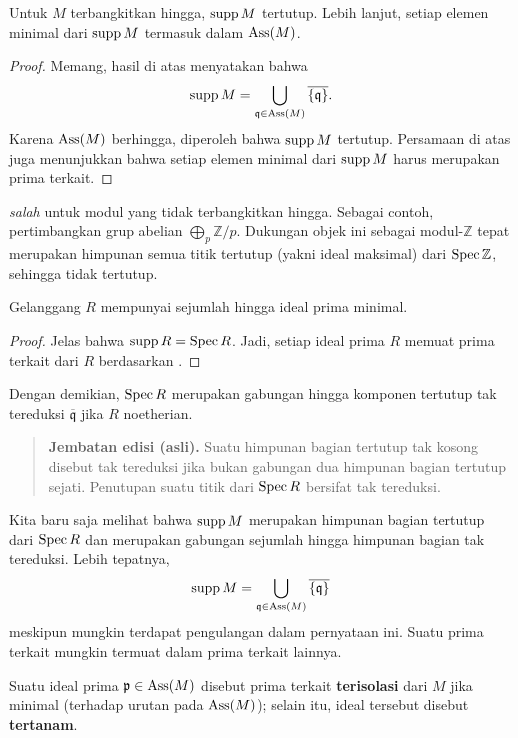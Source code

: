 \begin{corollary} \label{suppisclosed} Untuk $M$ terbangkitkan hingga,  
$\operatorname{supp} M$ tertutup. Lebih lanjut, setiap elemen minimal dari $\operatorname{supp} M$ termasuk dalam
$\operatorname{Ass}(M)$.
\end{corollary} 
\begin{proof} 
Memang, hasil di atas menyatakan bahwa
\[ \operatorname{supp} M  = \bigcup_{\mathfrak{q} \in \operatorname{Ass}(M)}
\overline{\left\{\mathfrak{q}\right\}}. \]
Karena $\operatorname{Ass}(M)$ berhingga, diperoleh bahwa $\operatorname{supp} M$ tertutup.
Persamaan di atas juga menunjukkan bahwa setiap elemen minimal dari $\operatorname{supp} M$ harus merupakan
prima terkait.
\end{proof} 

\begin{example} 
 \emph{salah} untuk modul yang tidak terbangkitkan
hingga. Sebagai contoh, pertimbangkan grup abelian $\bigoplus_p \mathbb{Z}/p$.
Dukungan objek ini sebagai modul-$\mathbb{Z}$ tepat merupakan himpunan semua
titik tertutup (yakni ideal maksimal) dari $\operatorname{Spec} \mathbb{Z}$, sehingga
tidak tertutup. 
\end{example} 

\begin{corollary} 
Gelanggang $R$ mempunyai sejumlah hingga ideal prima minimal. 
\end{corollary} 
\begin{proof} 
Jelas bahwa $\operatorname{supp} R = \operatorname{Spec} R$. Jadi, setiap ideal prima $R$
memuat prima terkait dari $R$ berdasarkan .
\end{proof} 

Dengan demikian, $\operatorname{Spec} R$ merupakan gabungan hingga komponen tertutup tak tereduksi
$\overline{\mathfrak{q}}$ jika $R$ noetherian.
\begin{quote}\small\textbf{Jembatan edisi (asli).}
Suatu himpunan bagian tertutup tak kosong disebut tak tereduksi jika bukan gabungan dua himpunan bagian
tertutup sejati. Penutupan suatu titik dari $\operatorname{Spec} R$ bersifat tak tereduksi.\end{quote}

Kita baru saja melihat bahwa $\operatorname{supp} M$ merupakan himpunan bagian tertutup dari $\operatorname{Spec} R$ dan merupakan gabungan
sejumlah hingga himpunan bagian tak tereduksi. Lebih tepatnya, 
\[ \operatorname{supp} M = \bigcup_{\mathfrak{q} \in \operatorname{Ass}(M)}
\overline{\left\{\mathfrak{q}\right\}}  \]
meskipun mungkin terdapat pengulangan dalam pernyataan ini. Suatu prima terkait mungkin termuat
dalam prima terkait lainnya.  

\begin{definition} 
Suatu ideal prima $\mathfrak{p} \in \operatorname{Ass}(M)$ disebut prima terkait \textbf{terisolasi} dari
$M$ jika minimal (terhadap urutan pada $\operatorname{Ass}(M)$); selain itu, ideal tersebut disebut
\textbf{tertanam}. 
\end{definition} 


